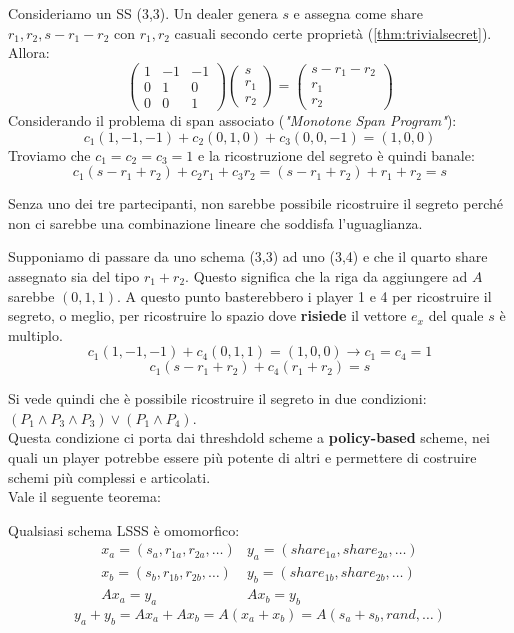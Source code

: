 \begin{example}
Consideriamo un SS (3,3). Un dealer genera $s$ e assegna come share $r_1,r_2,s-r_1-r_2$ con $r_1,r_2$ casuali secondo certe proprietà (\cref{thm:trivialsecret}). Allora:
\[
\left(\begin{array}{ccc}
  1 & - 1 & - 1\\
  0 & 1 & 0\\
  0 & 0 & 1
\end{array}\right)\left(\begin{array}{c}
  s\\
  r_1\\
  r_2
\end{array}\right)=\left(\begin{array}{c}
  s - r_1 - r_2\\
  r_1\\
  r_2
\end{array}\right)
\]
Considerando il problema di span associato (\textit{"Monotone Span Program"}): 
\[c_1(1,-1,-1)+c_2(0,1,0)+c_3(0,0,-1)=(1,0,0)\]
Troviamo che $c_1=c_2=c_3=1$ e la ricostruzione del segreto è quindi banale:
\[c_1(s-r_1+r_2)+c_2r_1+c_3r_2=(s-r_1+r_2)+r_1+r_2=s\]
\begin{remark}
Senza uno dei tre partecipanti, non sarebbe possibile ricostruire il segreto perché non ci sarebbe una combinazione lineare che soddisfa l'uguaglianza.
\end{remark}
\end{example}
\begin{remark}
Supponiamo di passare da uno schema (3,3) ad uno (3,4) e che il quarto share assegnato sia del tipo $r_1+r_2$. Questo significa che la riga da aggiungere ad $A$ sarebbe $(0,1,1)$. A questo punto basterebbero i player 1 e 4 per ricostruire il segreto, o meglio, per ricostruire lo spazio dove \textbf{risiede} il vettore $e_x$ del quale $s$ è multiplo.
\[c_1(1,-1,-1)+c_4(0,1,1)=(1,0,0)\longrightarrow c_1=c_4=1\]
\[c_1(s-r_1+r_2)+c_4(r_1+r_2)=s\]
\end{remark}
Si vede quindi che è possibile ricostruire il segreto in due condizioni: $(P_1\land P_3\land P_3)\lor(P_1\land P_4)$.\\
Questa condizione ci porta dai threshdold scheme a \textbf{policy-based} scheme, nei quali un player potrebbe essere più potente di altri e permettere di costruire schemi più complessi e articolati.\\
Vale il seguente teorema:
\begin{theorem}
Qualsiasi schema LSSS è omomorfico:
\[
\begin{array}{cc}
     x_a = (s_a,r_{1a},r_{2a},\dots)&  y_a=(share_{1a},share_{2a},\dots)\\
     x_b = (s_b,r_{1b},r_{2b},\dots)& y_b=(share_{1b},share_{2b},\dots)\\
     Ax_a=y_a & Ax_b=y_b
\end{array}
\]
\[y_a+y_b=Ax_a+Ax_b=A(x_a+x_b)=A(s_a+s_b,rand,\dots)\]
\end{theorem}
